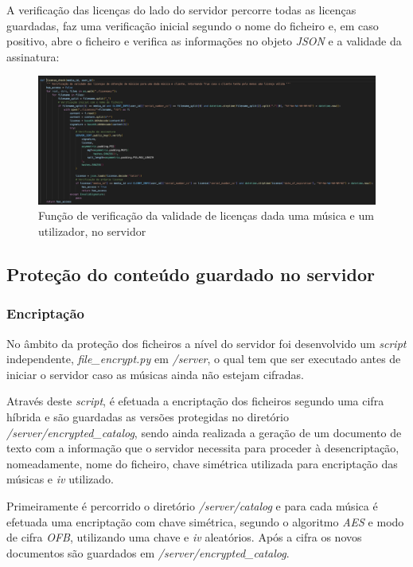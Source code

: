 \documentclass[10pt,english]{article}
\begin{document}
\par A verificação das licenças do lado do servidor percorre todas as licenças guardadas, faz uma verificação inicial segundo o nome do ficheiro e, em caso positivo, abre o ficheiro e verifica as informações no objeto \textit{JSON} e a validade da assinatura:

\begin{figure}[!h]
        \centering
        \includegraphics[width=\textwidth]{images/check_license_server.png}
        \caption{Função de verificação da validade de licenças dada uma música e um utilizador, no servidor}
\end{figure}


\clearpage

\subsection{Proteção do conteúdo guardado no servidor}
\subsubsection{Encriptação}
\par No âmbito da proteção dos ficheiros a nível do servidor foi desenvolvido um \textit{script} independente, \textit{file\_encrypt.py} em \textit{/server}, o qual tem que ser executado antes de iniciar o servidor caso as músicas ainda não estejam cifradas.

\par Através deste \textit{script}, é efetuada a encriptação dos ficheiros segundo uma cifra híbrida e são guardadas as versões protegidas no diretório \textit{/server/encrypted\_catalog}, sendo ainda realizada a geração de um documento de texto com a informação que o servidor necessita para proceder à desencriptação, nomeadamente, nome do ficheiro, chave simétrica utilizada para encriptação das músicas e \textit{iv} utilizado.

\par Primeiramente é percorrido o diretório \textit{/server/catalog} e para cada música é efetuada uma encriptação com chave simétrica, segundo o algoritmo \textit{AES} e modo de cifra \textit{OFB}, utilizando uma chave e \textit{iv} aleatórios. Após a cifra os novos documentos são guardados em \textit{/server/encrypted\_catalog}.
\end{document}
